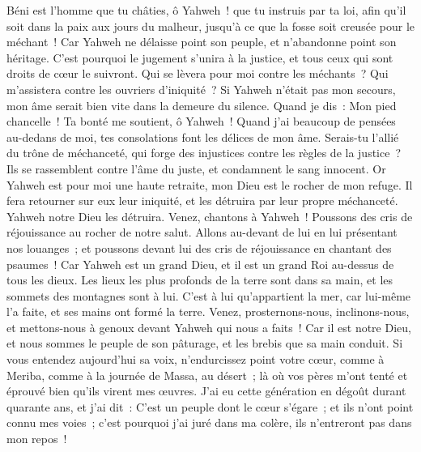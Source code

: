 \begin{multicols}{2}
Béni est l'homme que tu châties, ô Yahweh~! que tu instruis par ta loi,
afin qu'il soit dans la paix aux jours du malheur, jusqu'à ce que la fosse soit creusée pour le méchant~!
Car Yahweh ne délaisse point son peuple, et n'abandonne point son héritage.
C'est pourquoi le jugement s'unira à la justice, et tous ceux qui sont droits de cœur le suivront.
Qui se lèvera pour moi contre les méchants~? Qui m'assistera contre les ouvriers d'iniquité~?
Si Yahweh n'était pas mon secours, mon âme serait bien vite dans la demeure du silence.
Quand je dis~: Mon pied chancelle~! Ta bonté me soutient, ô Yahweh~!
Quand j'ai beaucoup de pensées au-dedans de moi, tes consolations font les délices de mon âme.
Serais-tu l'allié du trône de méchanceté, qui forge des injustices contre les règles de la justice~?
Ils se rassemblent contre l'âme du juste, et condamnent le sang innocent.
Or Yahweh est pour moi une haute retraite, mon Dieu est le rocher de mon refuge.
Il fera retourner sur eux leur iniquité, et les détruira par leur propre méchanceté. Yahweh notre Dieu les détruira.
\VerseOne{}Venez, chantons à Yahweh~! Poussons des cris de réjouissance au rocher de notre salut.
Allons au-devant de lui en lui présentant nos louanges~; et poussons devant lui des cris de réjouissance en chantant des psaumes~!
Car Yahweh est un grand Dieu, et il est un grand Roi au-dessus de tous les dieux.
Les lieux les plus profonds de la terre sont dans sa main, et les sommets des montagnes sont à lui.
C'est à lui qu'appartient la mer, car lui-même l'a faite, et ses mains ont formé la terre.
Venez, prosternons-nous, inclinons-nous, et mettons-nous à genoux devant Yahweh qui nous a faits~!
Car il est notre Dieu, et nous sommes le peuple de son pâturage, et les brebis que sa main conduit. Si vous entendez aujourd'hui sa voix,
n'endurcissez point votre cœur, comme à Meriba, comme à la journée de Massa, au désert~;
là où vos pères m'ont tenté et éprouvé bien qu'ils virent mes œuvres.
J'ai eu cette génération en dégoût durant quarante ans, et j'ai dit~: C'est un peuple dont le cœur s'égare~; et ils n'ont point connu mes voies~;
c'est pourquoi j'ai juré dans ma colère, ils n'entreront pas dans mon repos~!

\end{multicols}
